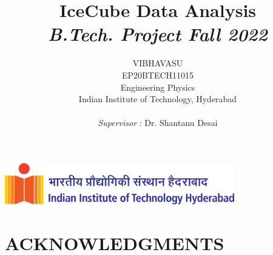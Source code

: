 \documentclass{article}
\title{IceCube Data Analysis\\ \textit{B.Tech. Project Fall 2022}}
\author{\Large
  VIBHAVASU \\
  \large EP20BTECH11015\\
  \large Engineering Physics\\
  \large Indian Institute of Technology, Hyderabad \\\\
  \large \textit{Supervisor} : Dr. Shantanu Desai
}
\begin{document}
\begin{center}
\includegraphics[width=0.75\textwidth]{Images/horzlogolong.png}
\end{center}
\maketitle 

\newpage
\tableofcontents
\newpage


\section{ACKNOWLEDGMENTS}

\newpage

%   
\printbibliography[title={\Large REFERENCES}]
\end{document}
